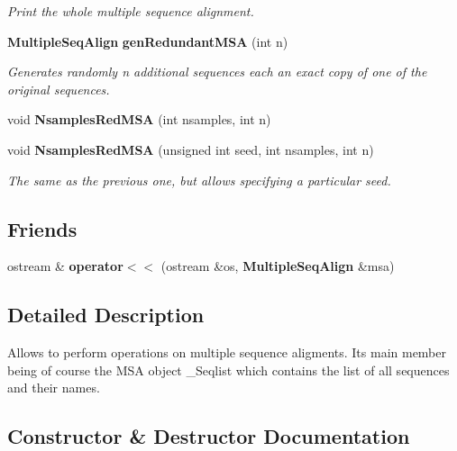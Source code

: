 \begin{CompactItemize}
\begin{CompactList}\small\item\em Print the whole multiple sequence alignment. \item\end{CompactList}\item 
{\bf Multiple\-Seq\-Align} {\bf gen\-Redundant\-MSA} (int n)\label{classMultipleSeqAlign_a14}

\begin{CompactList}\small\item\em Generates randomly n additional sequences each an exact copy of one of the original sequences. \item\end{CompactList}\item 
void {\bf Nsamples\-Red\-MSA} (int nsamples, int n)
\item 
void {\bf Nsamples\-Red\-MSA} (unsigned int seed, int nsamples, int n)\label{classMultipleSeqAlign_a16}

\begin{CompactList}\small\item\em The same as the previous one, but allows specifying a particular seed. \item\end{CompactList}\end{CompactItemize}
\subsection*{Friends}
\begin{CompactItemize}
\item 
ostream \& {\bf operator$<$$<$} (ostream \&os, {\bf Multiple\-Seq\-Align} \&msa)\label{classMultipleSeqAlign_n0}

\end{CompactItemize}


\subsection{Detailed Description}
Allows to perform operations on multiple sequence aligments. Its main member being of course the MSA object \_\-Seqlist which contains the list of all sequences and their names. 



\subsection{Constructor \& Destructor Documentation}
